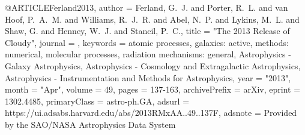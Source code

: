 @ARTICLE{Ferland2013,
       author = {{Ferland}, G.~J. and {Porter}, R.~L. and {van Hoof}, P.~A.~M. and
         {Williams}, R.~J.~R. and {Abel}, N.~P. and {Lykins}, M.~L. and
         {Shaw}, G. and {Henney}, W.~J. and {Stancil}, P.~C.},
        title = "{The 2013 Release of Cloudy}",
      journal = {\rmxaa},
     keywords = {atomic processes, galaxies: active, methods: numerical, molecular processes, radiation mechanisms: general, Astrophysics - Galaxy Astrophysics, Astrophysics - Cosmology and Extragalactic Astrophysics, Astrophysics - Instrumentation and Methods for Astrophysics},
         year = "2013",
        month = "Apr",
       volume = {49},
        pages = {137-163},
archivePrefix = {arXiv},
       eprint = {1302.4485},
 primaryClass = {astro-ph.GA},
       adsurl = {https://ui.adsabs.harvard.edu/abs/2013RMxAA..49..137F},
      adsnote = {Provided by the SAO/NASA Astrophysics Data System}
}

